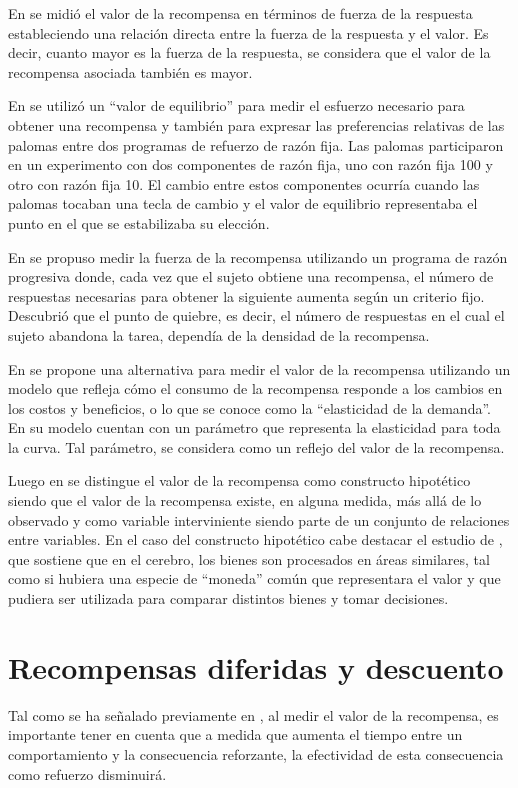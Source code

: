 En \parencite{hursh2008economic} se midió el valor de la recompensa en términos de fuerza de la respuesta estableciendo una relación directa entre la fuerza de la respuesta y el valor. Es decir, cuanto mayor es la fuerza de la respuesta, se considera que el valor de la recompensa asociada también es mayor.

En \parencite{verhave1963toward} se utilizó un “valor de equilibrio” para medir el esfuerzo necesario para obtener una recompensa y también para expresar las preferencias relativas de las palomas entre dos programas de refuerzo de razón fija. Las palomas participaron en un experimento con dos componentes de razón fija, uno con razón fija 100 y otro con razón fija 10. El cambio entre estos componentes ocurría cuando las palomas tocaban una tecla de cambio y el valor de equilibrio representaba el punto en el que se estabilizaba su elección.

En \parencite{hodos1961progressive} se propuso medir la fuerza de la recompensa utilizando un programa de razón progresiva donde, cada vez que el sujeto obtiene una recompensa, el número de respuestas necesarias para obtener la siguiente aumenta según un criterio fijo. Descubrió que el punto de quiebre, es decir, el número de respuestas en el cual el sujeto abandona la tarea, dependía de la densidad de la recompensa.

En \parencite{hursh2008economic} se propone una alternativa para medir el valor de la recompensa utilizando un modelo que refleja cómo el consumo de la recompensa responde a los cambios en los costos y beneficios, o lo que se conoce como la “elasticidad de la demanda”. En su modelo cuentan con un parámetro que representa la elasticidad para toda la curva. Tal parámetro, se considera como un reflejo del valor de la recompensa. 

Luego en \parencite{buritica2016valor} se distingue el valor de la recompensa como constructo hipotético siendo que el valor de 
la recompensa existe, en alguna medida, más allá de lo observado y como variable interviniente siendo parte de un conjunto de relaciones entre variables. En el caso del constructo hipotético cabe destacar el estudio de \parencite{chib2009evidence},  que sostiene que en el cerebro, los bienes son procesados en áreas similares, tal como si hubiera una especie de “moneda” común que representara el valor y que pudiera ser utilizada para comparar distintos bienes y tomar decisiones.

\section{Recompensas diferidas y descuento}
Tal como se ha señalado previamente en \parencite{miltenberger2012behavior}, al medir el valor de la recompensa, es importante tener en cuenta que a medida que aumenta el tiempo entre un comportamiento y la consecuencia reforzante, la efectividad de esta consecuencia como refuerzo disminuirá.

